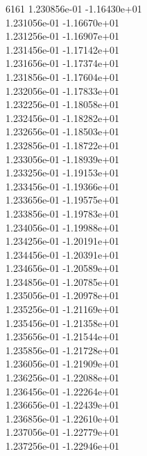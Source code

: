 6161	1.230856e-01	-1.16430e+01	\\ 	1.231056e-01	-1.16670e+01	\\ 	1.231256e-01	-1.16907e+01	\\ 	1.231456e-01	-1.17142e+01	\\ 	1.231656e-01	-1.17374e+01	\\ 	1.231856e-01	-1.17604e+01	\\ 	1.232056e-01	-1.17833e+01	\\ 	1.232256e-01	-1.18058e+01	\\ 	1.232456e-01	-1.18282e+01	\\ 	1.232656e-01	-1.18503e+01	\\ 	1.232856e-01	-1.18722e+01	\\ 	1.233056e-01	-1.18939e+01	\\ 	1.233256e-01	-1.19153e+01	\\ 	1.233456e-01	-1.19366e+01	\\ 	1.233656e-01	-1.19575e+01	\\ 	1.233856e-01	-1.19783e+01	\\ 	1.234056e-01	-1.19988e+01	\\ 	1.234256e-01	-1.20191e+01	\\ 	1.234456e-01	-1.20391e+01	\\ 	1.234656e-01	-1.20589e+01	\\ 	1.234856e-01	-1.20785e+01	\\ 	1.235056e-01	-1.20978e+01	\\ 	1.235256e-01	-1.21169e+01	\\ 	1.235456e-01	-1.21358e+01	\\ 	1.235656e-01	-1.21544e+01	\\ 	1.235856e-01	-1.21728e+01	\\ 	1.236056e-01	-1.21909e+01	\\ 	1.236256e-01	-1.22088e+01	\\ 	1.236456e-01	-1.22264e+01	\\ 	1.236656e-01	-1.22439e+01	\\ 	1.236856e-01	-1.22610e+01	\\ 	1.237056e-01	-1.22779e+01	\\ 	1.237256e-01	-1.22946e+01	\\ \hline
